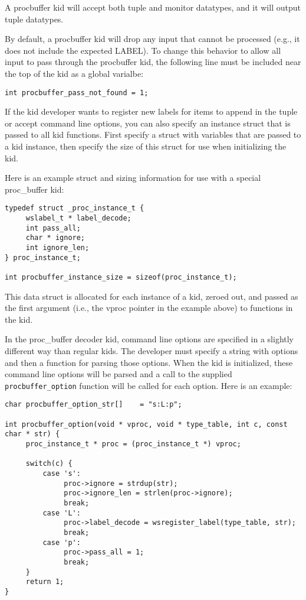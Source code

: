 \documentclass[11pt]{article}
\begin{document}
A procbuffer kid will accept both tuple and monitor datatypes, and it will output tuple datatypes. 

By default, a procbuffer kid will drop any input that cannot be processed (e.g., it does not include the expected
LABEL). To change this behavior to allow all input to pass through the procbuffer kid, the following line must be
included near the top of the kid as a global varialbe:

\begin{lstlisting}
int procbuffer_pass_not_found = 1;
\end{lstlisting}

If the kid developer wants to register new labels for items to append in 
the tuple or accept command line options, you can also specify an instance 
struct that is passed to all kid functions.  First specify a struct with 
variables that are passed to a kid instance, then specify the size of this
struct for use when initializing the kid. 

Here is an example struct and sizing information for use with a special 
proc\_buffer kid:

\begin{lstlisting}
typedef struct _proc_instance_t {
     wslabel_t * label_decode;
     int pass_all;
     char * ignore;
     int ignore_len;
} proc_instance_t;

int procbuffer_instance_size = sizeof(proc_instance_t);
\end{lstlisting}

This data struct is allocated for each instance of a kid, zeroed out, and 
passed as the first argument (i.e., the vproc pointer in the example above) to
functions in the kid.

In the proc\_buffer decoder kid, command line options are specified in a 
slightly different way than regular kids.  The developer must specify a string 
with options and then a function for parsing those options.  When the kid is 
initialized, these command line options will be parsed and a call to the 
supplied \texttt{procbuffer\_option} function will be called for each option. 
Here is an example:

\begin{lstlisting}
char procbuffer_option_str[]    = "s:L:p";

int procbuffer_option(void * vproc, void * type_table, int c, const char * str) {
     proc_instance_t * proc = (proc_instance_t *) vproc;

     switch(c) {
         case 's':
              proc->ignore = strdup(str);
              proc->ignore_len = strlen(proc->ignore);
              break;
         case 'L':
              proc->label_decode = wsregister_label(type_table, str);
              break;
         case 'p':
              proc->pass_all = 1;
              break;
     }
     return 1;
}
\end{lstlisting}
\end{document}
